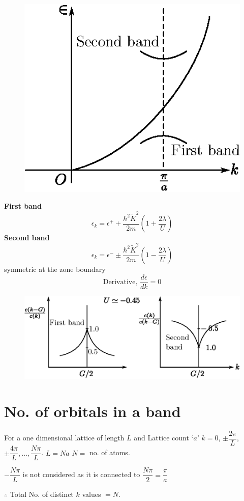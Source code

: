 \begin{figure}[H]
\centering
\includegraphics{images/lecture21/fig6.eps}
\end{figure}

\noindent
{\bf First band}
$$
\epsilon_{k}=\epsilon^{+}+\dfrac{\hbar^{2}\widetilde{K}^{2}}{2m}\left(1+\dfrac{2\lambda}{U}\right)
$$
{\bf Second band}
$$
\epsilon_{k}=\epsilon^{-}\pm \dfrac{\hbar^{2}\widetilde{K}^{2}}{2m}\left(1-\dfrac{2\lambda}{U}\right)
$$
symmetric at the zone boundary
$$
\text{Derivative, } \dfrac{d\epsilon}{dk}=0
$$
\begin{figure}[H]
\centering
\includegraphics{images/lecture21/fig7.eps}
\end{figure}

\section*{No. of orbitals in a band}

For a one dimensional lattice of length $L$ and Lattice count `$a$' $k=0$, $\pm \dfrac{2\pi}{L}$, $\pm \dfrac{4\pi}{L},\ldots,\dfrac{N\pi}{L}$. $L=Na$ $N=$ no. of atoms.

$-\dfrac{N\pi}{L}$ is not considered as it is connected to $\dfrac{N\pi}{2}=\dfrac{\pi}{a}$

$\therefore$ Total No. of distinct $k$ values $=N$.

